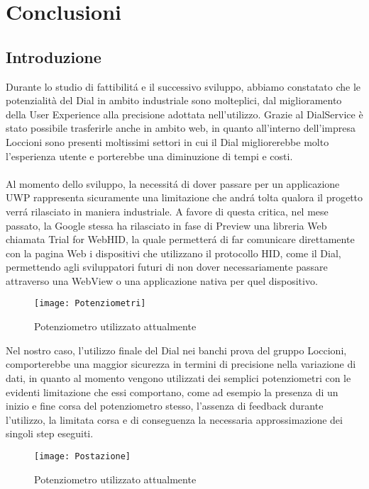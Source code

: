 \chapter{Conclusioni}
\label{chap: Conclusioni}

\section{Introduzione}
Durante lo studio di fattibilitá e il successivo sviluppo, abbiamo constatato che le potenzialità del Dial in ambito industriale sono molteplici, dal miglioramento della User Experience alla precisione adottata nell’utilizzo.
Grazie al DialService è stato possibile trasferirle anche in ambito web, in quanto all’interno dell’impresa Loccioni sono presenti moltissimi settori in cui il Dial migliorerebbe molto l’esperienza utente e porterebbe una diminuzione di tempi e costi.\\ \\
Al momento dello sviluppo, la necessitá di dover passare per un applicazione UWP rappresenta sicuramente una limitazione che andrá tolta qualora il progetto verrá rilasciato in maniera industriale.
A favore di questa critica, nel mese passato, la Google stessa ha rilasciato in fase di Preview una libreria Web chiamata Trial for WebHID, la quale permetterá di far comunicare direttamente con la pagina Web i dispositivi che utilizzano il protocollo HID, come il Dial, permettendo agli sviluppatori futuri di non dover necessariamente passare attraverso una WebView o una applicazione nativa per quel dispositivo.\\

\begin{figure}[htpb!]
\center
  \texttt{[image: Potenziometri]}
  \caption{Potenziometro utilizzato attualmente}
\end{figure}

Nel nostro caso, l’utilizzo finale del Dial nei banchi prova del gruppo Loccioni, comporterebbe una maggior sicurezza in termini di precisione nella variazione di dati, in quanto al momento vengono utilizzati dei semplici potenziometri con le evidenti limitazione che essi comportano, come ad esempio la presenza di un inizio e fine corsa del potenziometro stesso, l’assenza di feedback durante l’utilizzo, la limitata corsa e di conseguenza la necessaria approssimazione dei singoli step eseguiti.

\begin{figure}[htpb!]
\center
\texttt{[image: Postazione]}
\caption{Potenziometro utilizzato attualmente}
\end{figure}

